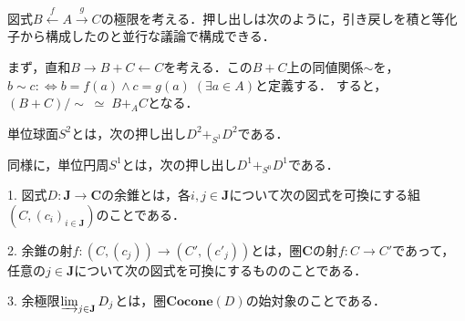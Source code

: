 \documentclass[uplatex, 12pt, dvipdfmx]{jsarticle}
\begin{document}
\begin{example*}[Setsでの押し出し]
    図式$B\xleftarrow{f}A\xrightarrow{g}C$の極限を考える．押し出しは次のように，引き戻しを積と等化子から構成したのと並行な議論で構成できる．

    まず，直和$B\rightarrow B+C \leftarrow C$を考える．この$B+ C$上の同値関係$\sim$を，$b\sim c:\Leftrightarrow b=f(a)\land c=g(a)\;(\exists a\in A)$と定義する．
    すると，$(B+C)/\sim\;\simeq\; B+_AC$となる．
\end{example*}
\begin{example}[Topでの押し出し]
    単位球面$S^2$とは，次の押し出し$D^2+_{S^1}D^2$である．
    \begin{center}
    \end{center}
    同様に，単位円周$S^1$とは，次の押し出し$D^1+_{S^0}D^1$である．
    \begin{center}
    \end{center}
\end{example}

\begin{definition*}[Colimits]
    1. 図式$D:\mathbf{J}\to \mathbf{C}$の余錐とは，各$i,j\in\mathbf{J}$について次の図式を可換にする組$(C,(c_i)_{i\in\mathbf{J}})$のことである．
    \begin{center}
    \end{center}
    
    2. 余錐の射$f:(C,(c_j))\to (C',(c'_j))$とは，圏$\mathbf{C}$の射$f:C\to C'$であって，任意の$j\in\mathbf{J}$について次の図式を可換にするもののことである．
    \begin{center}
    \end{center}

    3. 余極限$\varinjlim_{j\in\mathbf{J}}D_j$とは，圏$\mathbf{Cocone}(D)$の始対象のことである．
\end{definition*}
\end{document}
